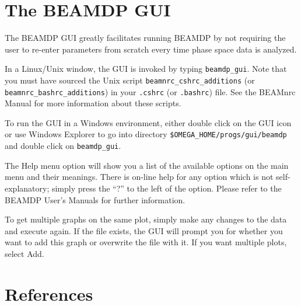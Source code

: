 \documentclass[12pt,twoside]{article}
\begin{document}

\section{The BEAMDP GUI}

The BEAMDP GUI greatly facilitates running BEAMDP by not requiring
the user to re-enter parameters from scratch every time phase space
data is analyzed.

In a Linux/Unix window, the GUI is invoked by typing {\tt beamdp\_gui}.
Note that you must have sourced the Unix script
{\tt beamnrc\_cshrc\_additions} (or {\tt beamnrc\_bashrc\_additions}) in
your {\tt .cshrc} (or {\tt .bashrc}) file.  See the BEAMnrc Manual\cite{Ro04a}
for more information about these scripts.

To run the GUI in a Windows environment, either double click on
the GUI icon or use Windows Explorer to go into directory
{\tt \$OMEGA\_HOME/progs/gui/beamdp} and double click on
{\tt beamdp\_gui}.

The {\sf Help} menu option will show you a list of the available
options on the main menu and their meanings.
There is on-line help for any option which is not self-explanatory;
simply press the ``?'' to the left of the option.
Please refer to the BEAMDP User's Manuals\cite{MR04a,MR04b}
for further information.

To get multiple graphs on the same plot, simply make any changes to the
data and execute again.  If the file exists, the GUI will prompt you for
whether you want to add this graph or overwrite the file with it.  If
you want multiple plots, select {\sf Add}.

\section{References}



\end{document}
